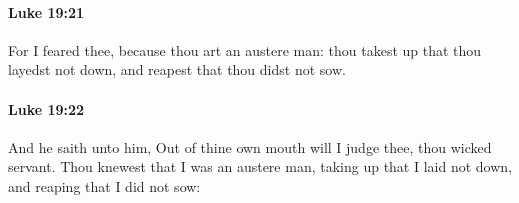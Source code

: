 		\paragraph{Luke 19:21} %
			\label{LUKE-19-21}

			For I feared thee, because thou art an austere man: thou takest up that thou layedst not down, and reapest that thou didst not sow.

			\begin{framed}
			\scriptsize
				\begin{compactdesc}
					\item[SBLG] 
				\end{compactdesc}
			\end{framed}

		\paragraph{Luke 19:22} %
			\label{LUKE-19-22}

			And he saith unto him, Out of thine own mouth will I judge thee, thou wicked servant. Thou knewest that I was an austere man, taking up that I laid not down, and reaping that I did not sow:

